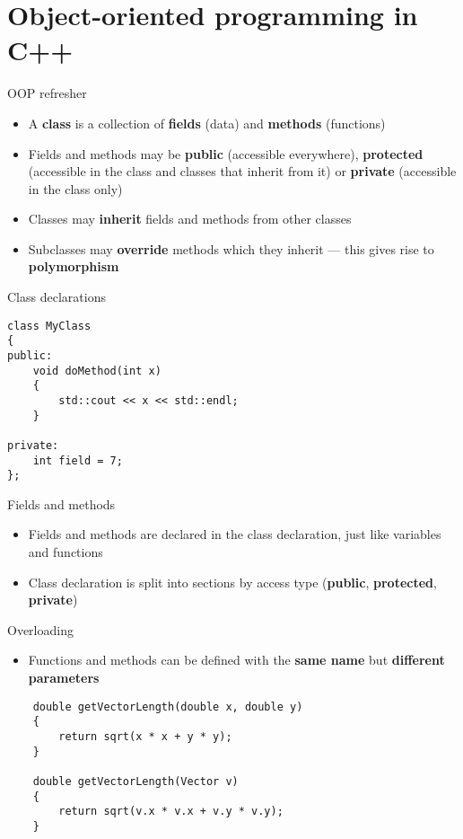 \part{Object-oriented programming in C++}
\frame{\partpage}

\begin{frame}[fragile]{OOP refresher}
    \begin{itemize}
        \item A \textbf{class} is a collection of \textbf{fields} (data) and \textbf{methods} (functions)
        \item Fields and methods may be \textbf{public} (accessible everywhere), \textbf{protected} (accessible in the class and classes that inherit from it) or \textbf{private} (accessible in the class only)
        \item Classes may \textbf{inherit} fields and methods from other classes
        \item Subclasses may \textbf{override} methods which they inherit --- this gives rise to \textbf{polymorphism}
    \end{itemize}
\end{frame}

\begin{frame}[fragile]{Class declarations}
    \begin{lstlisting}
class MyClass
{
public:
    void doMethod(int x)
    {
        std::cout << x << std::endl;
    }

private:
    int field = 7;
};
    \end{lstlisting}
\end{frame}

\begin{frame}[fragile]{Fields and methods}
    \begin{itemize}
        \item Fields and methods are declared in the class declaration, just like variables and functions
        \item Class declaration is split into sections by access type (\textbf{public}, \textbf{protected}, \textbf{private})
    \end{itemize}
\end{frame}

\begin{frame}[fragile]{Overloading}
    \begin{itemize}
        \item Functions and methods can be defined with the \textbf{same name} but \textbf{different parameters}
    \end{itemize}
    \begin{lstlisting}
    double getVectorLength(double x, double y)
    {
        return sqrt(x * x + y * y);
    }

    double getVectorLength(Vector v)
    {
        return sqrt(v.x * v.x + v.y * v.y);
    }
    \end{lstlisting}
\end{frame}

